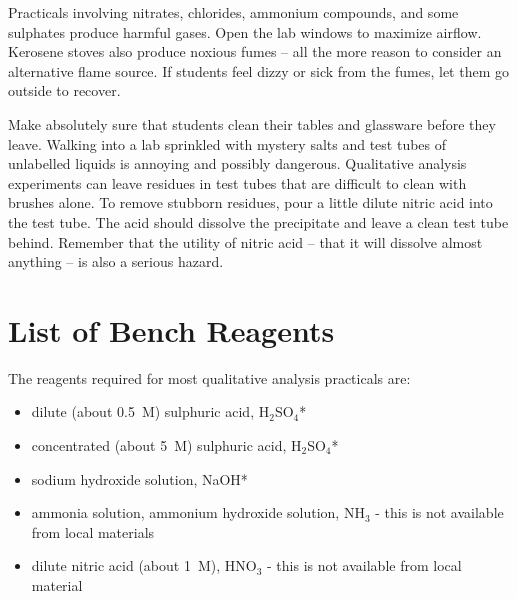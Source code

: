 Practicals involving nitrates, 
chlorides, 
ammonium compounds, 
and some sulphates produce harmful gases. 
Open the lab windows to maximize airflow. 
Kerosene stoves also produce noxious fumes -- 
all the more reason to consider an alternative flame source. 
If students feel dizzy or sick from the fumes, 
let them go outside to recover.

Make absolutely sure that students clean their tables 
and glassware before they leave. 
Walking into a lab sprinkled with mystery salts 
and test tubes of unlabelled liquids is annoying and possibly dangerous. 
Qualitative analysis experiments can leave residues in test tubes 
that are difficult to clean with brushes alone. 
To remove stubborn residues, 
pour a little dilute nitric acid into the test tube. 
The acid should dissolve the precipitate 
and leave a clean test tube behind. 
Remember that the utility of nitric acid -- 
that it will dissolve almost anything -- is also a serious hazard.


\section{List of Bench Reagents}

The reagents required for most qualitative analysis practicals are:
\begin{itemize}
\item{dilute (about 0.5~M) sulphuric acid, 
H$_{2}$SO$_{4}$*}
\item{concentrated (about 5~M) sulphuric acid, 
H$_{2}$SO$_{4}$*}
\item{sodium hydroxide solution, 
NaOH*}
\item{ammonia solution, 
ammonium hydroxide solution, 
NH$_{3}$ - this is not available from local materials}
\item{dilute nitric acid (about 1~M), 
HNO$_{3}$ - this is not available from local material}
\end{itemize}

